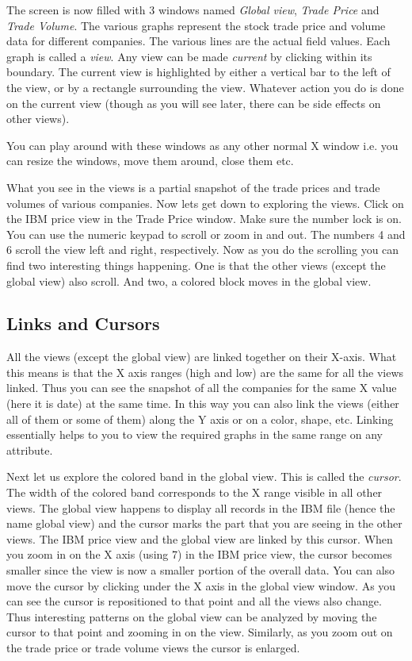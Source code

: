 
The screen is now filled with 3 windows named {\em Global view}, {\em
Trade Price} and {\em Trade Volume}. The various graphs represent the
stock trade price and volume data for different companies. The various
lines are the actual field values. Each graph is called a {\em
view}. Any view can be made {\em current} by clicking within its
boundary. The current view is highlighted by either a vertical bar to
the left of the view, or by a rectangle surrounding the view. Whatever
action you do is done on the current view (though as you will see
later, there can be side effects on other views).

You can play around with these windows as any other normal X window
i.e. you can resize the windows, move them around, close them etc.

What you see in the views is a partial snapshot of the trade prices
and trade volumes of various companies. Now lets get down to exploring
the views. Click on the IBM price view in the Trade Price window. Make
sure the number lock is on. You can use the numeric keypad to scroll
or zoom in and out. The numbers 4 and 6 scroll the view left and
right, respectively. Now as you do the scrolling you can find two
interesting things happening. One is that the other views (except the
global view) also scroll. And two, a colored block moves in the global
view.

\subsection{Links and Cursors}

All the views (except the global view) are linked together on their
X-axis. What this means is that the X axis ranges (high and low) are
the same for all the views linked. Thus you can see the snapshot of
all the companies for the same X value (here it is date) at the same
time. In this way you can also link the views (either all of them or
some of them) along the Y axis or on a color, shape, etc. Linking
essentially helps to you to view the required graphs in the same range
on any attribute.

Next let us explore the colored band in the global view. This is
called the {\em cursor}. The width of the colored band corresponds to
the X range visible in all other views. The global view happens to
display all records in the IBM file (hence the name global view) and
the cursor marks the part that you are seeing in the other views. The
IBM price view and the global view are linked by this cursor. When you
zoom in on the X axis (using 7) in the IBM price view, the cursor
becomes smaller since the view is now a smaller portion of the overall
data. You can also move the cursor by clicking under the X axis in the
global view window. As you can see the cursor is repositioned to that
point and all the views also change. Thus interesting patterns on the
global view can be analyzed by moving the cursor to that point and
zooming in on the view. Similarly, as you zoom out on the trade price
or trade volume views the cursor is enlarged.

